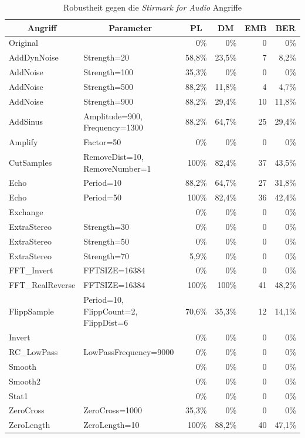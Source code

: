 \begin{table}[h]
\small
\begin{tabular}{llrrrr}
\hline
\multicolumn{1}{c}{\textbf{Angriff}} & \multicolumn{1}{c}{\textbf{Parameter}} & \multicolumn{1}{c}{\textbf{PL}} & \multicolumn{1}{c}{\textbf{DM}} & \multicolumn{1}{c}{\textbf{EMB}} & \multicolumn{1}{c}{\textbf{BER}} \\ \hline
Original         & 	& 0\%    & 0\%    & 0   & 0\%    \\
AddDynNoise      & Strength=20 	& 58,8\% & 23,5\% & 7   & 8,2\%  \\
AddNoise         & Strength=100 	 & 35,3\% & 0\%    & 0   & 0\%    \\
AddNoise         & Strength=500 	 & 88,2\% & 11,8\% & 4   & 4,7\%  \\
AddNoise         & Strength=900 	 & 88,2\% & 29,4\% & 10  & 11,8\% \\
AddSinus         & Amplitude=900, Frequency=1300        & 88,2\% & 64,7\% & 25  & 29,4\% \\
Amplify          & Factor=50 	 & 0\%    & 0\%    & 0   & 0\%    \\
CutSamples       & RemoveDist=10, RemoveNumber=1        & 100\%  & 82,4\% & 37  & 43,5\% \\
Echo             & Period=10 	 & 88,2\% & 64,7\% & 27  & 31,8\% \\
Echo             & Period=50 	 & 100\%  & 82,4\% & 36  & 42,4\% \\
Exchange         & 	& 0\%    & 0\%    & 0   & 0\%    \\
ExtraStereo      & Strength=30 	& 0\%    & 0\%    & 0   & 0\%    \\
ExtraStereo      & Strength=50 	& 0\%    & 0\%    & 0   & 0\%    \\
ExtraStereo      & Strength=70 	& 5,9\%  & 0\%    & 0   & 0\%    \\
FFT\_Invert      & FFTSIZE=16384 	& 0\%    & 0\%    & 0   & 0\%    \\
FFT\_RealReverse & FFTSIZE=16384 	& 100\%  & 100\%  & 41  & 48,2\% \\
FlippSample      & Period=10, FlippCount=2, FlippDist=6 & 70,6\% & 35,3\% & 12  & 14,1\% \\
Invert           & 	& 0\%    & 0\%    & 0   & 0\%    \\
RC\_LowPass      & LowPassFrequency=9000                & 0\%    & 0\%    & 0   & 0\%    \\
Smooth           & 	& 0\%    & 0\%    & 0   & 0\%    \\
Smooth2          & 	& 0\%    & 0\%    & 0   & 0\%    \\
Stat1            & 	& 0\%    & 0\%    & 0   & 0\%    \\
ZeroCross        & ZeroCross=1000 	 & 35,3\% & 0\%    & 0   & 0\%    \\
ZeroLength       & ZeroLength=10 	& 100\%  & 88,2\% & 40  & 47,1\% \\ \hline
\end{tabular}

\caption{Robustheit gegen die \textit{Stirmark for Audio} Angriffe}
\label{tab:stirmark}
\end{table}

